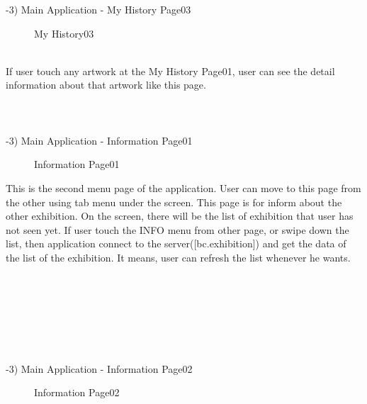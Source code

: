 \documentclass[conference]{IEEEtran}
\begin{document}
-3) Main Application - My History Page03\\
\begin{figure}[htbp]
\begin{center}
    \caption{My History03} 
\end{center}
\end{figure}\\
\quad If user touch any artwork at the My History Page01, user can see the detail information about that artwork like this page.\\\\\\\\

-3) Main Application - Information Page01
\begin{figure}[htbp]
\begin{center}
    \caption{Information Page01} 
\end{center}
\end{figure}

This is the second menu page of the application. User can move to this page from the other using tab menu under the screen. This page is for inform about the other exhibition. On the screen, there will be the list of exhibition that user has not seen yet. If user touch the INFO menu from other page, or swipe down the list, then application connect to the server([bc.exhibition]) and get the data of the list of the exhibition. It means, user can refresh the list whenever he wants.\\\\\\\\\\\\\\\\

-3) Main Application - Information Page02
\begin{figure}[htbp]
\begin{center}
    \caption{Information Page02} 
\end{center}
\end{figure}
\end{document}

